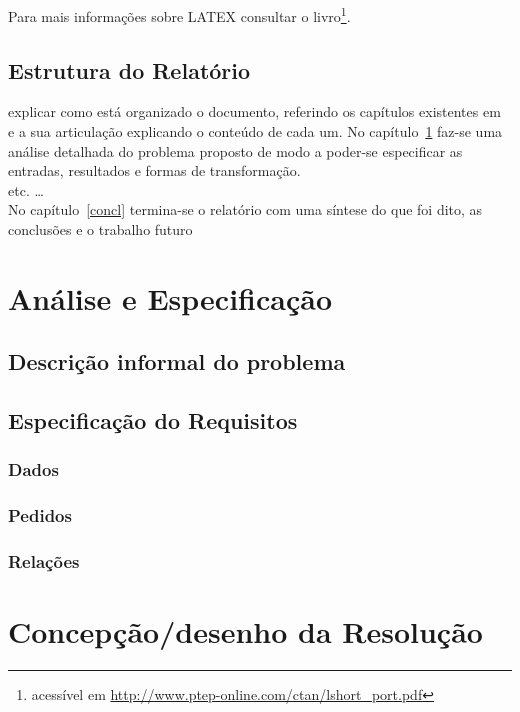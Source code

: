 \documentclass[11pt,a4paper]{report}%
\begin{document}
\newpage

Para mais informações sobre LATEX
consultar o livro\footnote{acessível em \url{http://www.ptep-online.com/ctan/lshort_port.pdf}}.

\section*{Estrutura do Relatório}
explicar como está organizado o documento, referindo os capítulos existentes em~\cite{deransart:1990}
e a sua articulação explicando o conteúdo de cada um.
No capítulo~\ref{chap:analiseEspecificacao} faz-se uma análise detalhada do problema proposto
de modo a poder-se especificar  as entradas, resultados e formas de transformação.\\
etc. \ldots\\ %
No capítulo~\ref{concl} termina-se o relatório com uma síntese do que foi dito,
as conclusões e o trabalho futuro



\chapter{Análise e Especificação} \label{chap:analiseEspecificacao} %
\section{Descrição informal do problema} \label{sec:descricaoProblema} %
\section{Especificação do Requisitos}
\subsection{Dados} \label{subsec:dados} %
\subsection{Pedidos}
\subsection{Relações}

\chapter{Concepção/desenho da Resolução}
\end{document}
